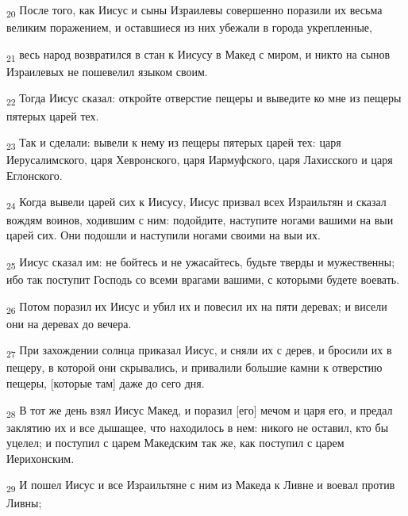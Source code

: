 \begin{tcolorbox}
\textsubscript{20} После того, как Иисус и сыны Израилевы совершенно поразили их весьма великим поражением, и оставшиеся из них убежали в города укрепленные,
\end{tcolorbox}
\begin{tcolorbox}
\textsubscript{21} весь народ возвратился в стан к Иисусу в Макед с миром, и никто на сынов Израилевых не пошевелил языком своим.
\end{tcolorbox}
\begin{tcolorbox}
\textsubscript{22} Тогда Иисус сказал: откройте отверстие пещеры и выведите ко мне из пещеры пятерых царей тех.
\end{tcolorbox}
\begin{tcolorbox}
\textsubscript{23} Так и сделали: вывели к нему из пещеры пятерых царей тех: царя Иерусалимского, царя Хевронского, царя Иармуфского, царя Лахисского и царя Еглонского.
\end{tcolorbox}
\begin{tcolorbox}
\textsubscript{24} Когда вывели царей сих к Иисусу, Иисус призвал всех Израильтян и сказал вождям воинов, ходившим с ним: подойдите, наступите ногами вашими на выи царей сих. Они подошли и наступили ногами своими на выи их.
\end{tcolorbox}
\begin{tcolorbox}
\textsubscript{25} Иисус сказал им: не бойтесь и не ужасайтесь, будьте тверды и мужественны; ибо так поступит Господь со всеми врагами вашими, с которыми будете воевать.
\end{tcolorbox}
\begin{tcolorbox}
\textsubscript{26} Потом поразил их Иисус и убил их и повесил их на пяти деревах; и висели они на деревах до вечера.
\end{tcolorbox}
\begin{tcolorbox}
\textsubscript{27} При захождении солнца приказал Иисус, и сняли их с дерев, и бросили их в пещеру, в которой они скрывались, и привалили большие камни к отверстию пещеры, [которые там] даже до сего дня.
\end{tcolorbox}
\begin{tcolorbox}
\textsubscript{28} В тот же день взял Иисус Макед, и поразил [его] мечом и царя его, и предал заклятию их и все дышащее, что находилось в нем: никого не оставил, кто бы уцелел; и поступил с царем Македским так же, как поступил с царем Иерихонским.
\end{tcolorbox}
\begin{tcolorbox}
\textsubscript{29} И пошел Иисус и все Израильтяне с ним из Македа к Ливне и воевал против Ливны;
\end{tcolorbox}
